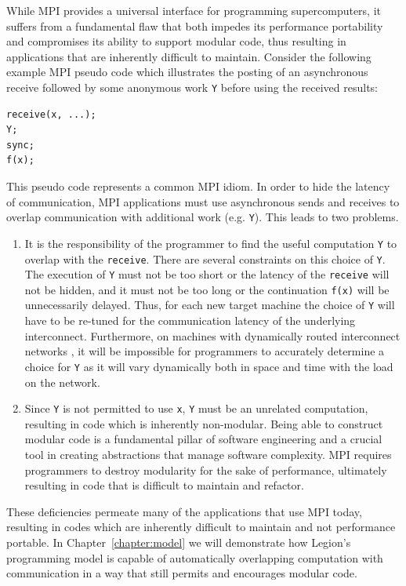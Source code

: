 While MPI provides a universal interface for 
programming supercomputers, it suffers from a
fundamental flaw that both impedes its performance
portability and compromises its ability to support 
modular code, thus resulting in applications that are
inherently difficult to maintain. Consider the following 
example MPI pseudo code which illustrates the posting of
an asynchronous receive followed by some anonymous
work {\tt Y} before using the received results:
\begin{verbatim}
receive(x, ...);
Y;
sync;
f(x);
\end{verbatim}
This pseudo code represents a common MPI idiom. In
order to hide the latency of communication, MPI
applications must use asynchronous sends and 
receives to overlap communication with additional
work (e.g. {\tt Y}). This leads to two problems.
\begin{enumerate}
\item It is the responsibility of the programmer
      to find the useful computation {\tt Y} to
      overlap with the {\tt receive}. There are
      several constraints on this choice of {\tt Y}.
      The execution of {\tt Y} must not be too short
      or the latency of the {\tt receive} will not
      be hidden, and it must not be too long or the
      continuation {\tt f(x)} will be unnecessarily
      delayed. Thus, for each new target machine the
      choice of {\tt Y} will have to be re-tuned for 
      the communication latency of the underlying
      interconnect. Furthermore, on 
      machines with dynamically routed interconnect
      networks \cite{CrayGemini}, it will be impossible
      for programmers to accurately determine a
      choice for {\tt Y} as it will vary dynamically 
      both in space and time with the load on the network.
\item Since {\tt Y} is not permitted to use {\tt x},
      {\tt Y} must be an unrelated computation, resulting
      in code which is inherently non-modular. Being
      able to construct modular code is a fundamental 
      pillar of software engineering and a crucial
      tool in creating abstractions that manage
      software complexity. MPI requires 
      programmers to destroy modularity for the
      sake of performance, ultimately resulting in code 
      that is difficult to maintain and refactor.
\end{enumerate}
These deficiencies permeate many of the applications
that use MPI today, resulting in codes which are inherently
difficult to maintain and not performance portable. In
Chapter~\ref{chapter:model} we will demonstrate how Legion's
programming model is capable of automatically overlapping
computation with communication in a way that still
permits and encourages modular code.


